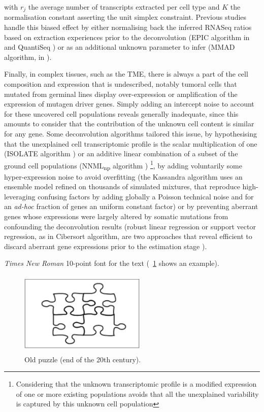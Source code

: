 \documentclass[long, final]{jobim}
\begin{document}
with $r_j$ the average number of transcripts extracted per cell type and $K$ the normalisation constant asserting the unit simplex constraint. Previous studies handle this biased effect by either normalising back the inferred RNASeq ratios based on extraction experiences prior to the deconvolution (EPIC algorithm in \cite{racle_etal17} and QuantiSeq \cite{finotello_etal19}) or as an additional unknown parameter to infer (MMAD algorithm, in \cite{liebner_etal14}).

Finally, in complex tissues, such as the TME, there is always a part of the cell composition and expression that is undescribed, notably tumoral cells that mutated from germinal lines display over-expression or amplification of the expression of mutagen driver genes. Simply adding an intercept noise to account for these uncovered cell populations reveals generally inadequate, since this amounts to consider that the contribution of the unknown cell content is similar for any gene. Some deconvolution algorithms tailored this issue, by hypothesising that the unexplained cell transcriptomic profile is the scalar multiplication of one (ISOLATE algorithm \cite{quon_morris09}) or an additive linear combination of a subset of the ground cell populations (NNML\textsubscript{np} algorithm \cite{qiao_etal12}) \footnote{Considering that the unknown transcriptomic profile is a modified expression of one or more existing populations avoids that all the unexplained variability is captured by this unknown cell population}, by adding voluntarily some hyper-expression noise to avoid overfitting (the Kassandra algorithm uses an ensemble model refined on thousands of simulated mixtures, that reproduce high-leveraging confusing factors by adding globally a Poisson technical noise and for an \textit{ad-hoc} fraction of genes an uniform constant factor) or by preventing aberrant genes whose expressions were largely altered by somatic mutations from confounding the deconvolution results (robust linear regression or support vector regression, as in Cibersort algorithm, are two approaches that reveal efficient to discard aberrant gene expressions prior to the estimation stage ).  



\emph{Times New Roman} 10-point font for the text (\figurename~\ref{fig:puzzle} shows an
example).

 \begin{figure}
   \begin{center}
     \setlength{\unitlength}{5mm}
     \includegraphics[height=4cm,width=6cm]{figs/fig1}
   \end{center}
   \caption{Old \jobim puzzle (end of the 20th century).}
   \label{fig:puzzle}
 \end{figure}
\end{document}
